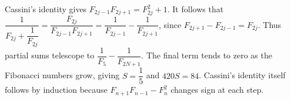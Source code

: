 Cassini's identity gives $F_{2j-1}F_{2j+1}=F_{2j}^2+1$. It follows that $\dfrac{1}{F_{2j}+\dfrac{1}{F_{2j}}}=\dfrac{F_{2j}}{F_{2j-1}F_{2j+1}}=\dfrac{1}{F_{2j-1}}-\dfrac{1}{F_{2j+1}}$, since $F_{2j+1}-F_{2j-1}=F_{2j}$. Thus partial sums telescope to $\dfrac{1}{F_5}-\dfrac{1}{F_{2N+1}}$. The final term tends to zero as the Fibonacci numbers grow, giving $S=\dfrac{1}{5}$ and $\boxed{420S=84}$. Cassini's identity itself follows by induction because $F_{n+1}F_{n-1}-F_n^2$ changes sign at each step.
